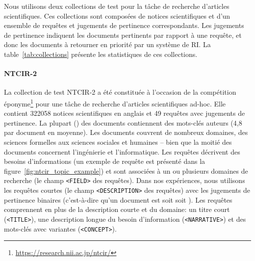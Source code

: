 Nous utilisons deux collections de test pour la tâche de recherche d'articles scientifiques.
Ces collections sont composées de notices scientifiques et d'un ensemble de requêtes et jugements de pertinence correspondants.
Les jugements de pertinence indiquent les documents pertinents par rapport à une requête, et donc les documents à retourner en priorité par un système de RI.
La table~\ref{tab:collections} présente les statistiques de ces collections.



\paragraph{NTCIR-2~\cite{kando_overview_2001}}
La collection de test NTCIR-2 a été constituée à l'occasion de la compétition éponyme\footnote{\url{https://research.nii.ac.jp/ntcir/}} pour une tâche de recherche d'articles scientifiques ad-hoc.
Elle contient \num{322 058} notices scientifiques en anglais et 49 requêtes avec jugements de pertinence.
La plupart () des documents contiennent des mots-clés auteurs (4,8 par document en moyenne).
Les documents couvrent de nombreux domaines, des sciences formelles aux sciences sociales et humaines -- bien que la moitié des documents concernent l'ingénierie et l'informatique.
Les requêtes décrivent des besoins d'informations (un exemple de requête est présenté dans la figure~\ref{fig:ntcir_topic_example}) et sont associées à un ou plusieurs domaines de recherche (le champ \texttt{<FIELD>} des requêtes).
Dans nos expériences, nous utilisons les requêtes courtes (le champ \texttt{<DESCRIPTION>} des requêtes) avec les jugements de pertinence binaires (c'est-à-dire qu'un document est soit  soit ).
Les requêtes comprennent en plus de la description courte et du domaine: un titre court (\texttt{<TITLE>}), une description longue du besoin d'information (\texttt{<NARRATIVE>}) et des mots-clés avec variantes (\texttt{<CONCEPT>}).




